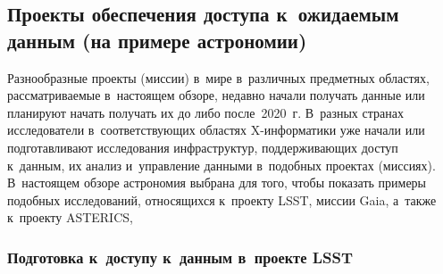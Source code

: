 \begin{multicols}{2}
\subsection{Проекты обеспечения доступа к~ожидаемым данным (на примере 
астрономии)}

  Разнообразные проекты (миссии) в~мире в~различных предметных областях, 
рассматриваемые в~настоящем обзоре, недавно начали получать данные или планируют 
начать получать их до либо после~2020~г. В~разных странах исследователи 
в~соответствующих областях X-ин\-фор\-ма\-ти\-ки уже начали или подготавливают 
исследования инфраструктур, поддерживающих доступ к~данным, их анализ и~управ\-ле\-ние 
данными в~подобных проектах (миссиях). В~настоящем обзоре астрономия выбрана для 
того, чтобы показать примеры подобных исследований, относящихся к~проекту LSST, 
миссии Gaia, а~также к~проекту ASTERICS,

\subsubsection{Подготовка к~доступу к~данным в~проекте LSST}


\end{multicols}
